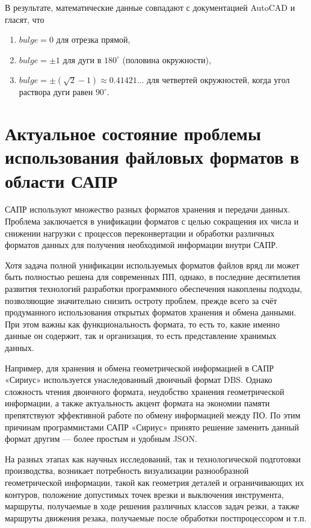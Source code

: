 В результате, математические данные совпадают с документацией AutoCAD \cite{autocad2012dxf} и гласят, что

\begin{enumerate}
	\item $bulge = 0$ для отрезка прямой,
	\item $bulge = \pm1$ для дуги в $180^{\circ}$ (половина окружности),
	\item $bulge = \pm(\sqrt2-1) \approx0.41421...$ для четвертей окружностей, когда угол раствора дуги равен $90^{\circ}$.
\end{enumerate}

\section{Актуальное состояние проблемы использования файловых форматов в области САПР} \label{sec:actual}

САПР используют множество разных форматов хранения и передачи данных. Проблема заключается в унификации форматов с целью сокращения их числа и снижении нагрузки с процессов переконвертации и обработки различных форматов данных для получения необходимой информации внутри САПР.

Хотя задача полной унификации используемых форматов файлов вряд ли может быть полностью решена для современных  ПП, однако, в последние десятилетия развития технологий разработки программного обеспечения накоплены подходы, позволяющие значительно снизить остроту проблем, прежде всего за счёт продуманного использования открытых форматов хранения и обмена данными. При этом важны как функциональность формата, то есть то, какие именно данные он содержит, так и организация, то есть представление хранимых данных.

Например, для хранения и обмена геометрической информацией в САПР «Сириус» используется унаследованный двоичный формат DBS. Однако сложность чтения двоичного формата, неудобство хранения геометрической информации, а также актуальность акцент формата на экономии памяти препятствуют эффективной работе по обмену информацией между ПО. По этим причинам программистами САПР «Сириус» принято решение заменить данный формат другим --- более простым и удобным JSON.

На разных этапах как научных исследований, так и технологической подготовки производства, возникает потребность визуализации разнообразной геометрической информации, такой как геометрия деталей и ограничивающих их контуров, положение допустимых точек врезки и выключения инструмента, маршруты, получаемые в ходе решения различных классов задач резки, а также маршруты движения резака, получаемые после обработки постпроцессором и т.п.

